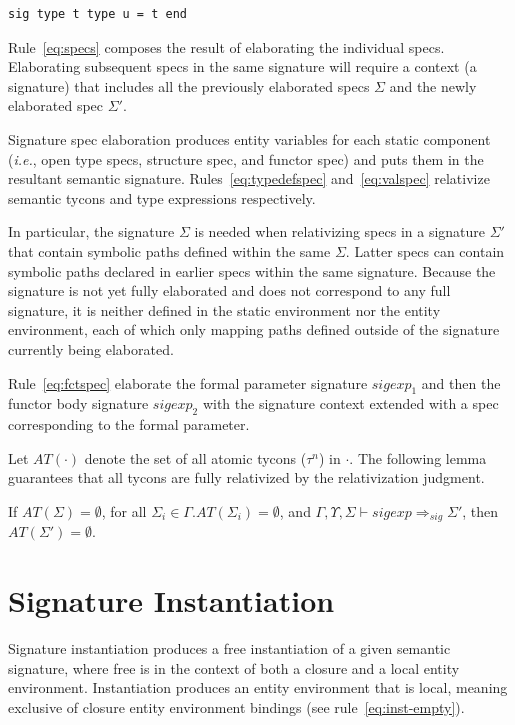 \documentclass[9pt,nocopyrightspace, fleqn]{sigplanconf}
\begin{document}
\begin{lstlisting}
sig type t type u = t end
\end{lstlisting}

Rule~\ref{eq:specs} composes the result of elaborating the individual specs. Elaborating subsequent specs in the same signature will require a context (a signature) that includes all the previously elaborated specs $\Sigma$ and the newly elaborated spec $\Sigma'$.  

Signature spec elaboration produces entity variables for each static
component (\emph{i.e.}, open type specs, structure spec, and functor
spec) and puts them in the resultant semantic
signature. Rules~\ref{eq:typedefspec} and~\ref{eq:valspec} relativize
semantic tycons and type expressions respectively. 

In particular, the signature $\Sigma$ is needed when relativizing specs in a signature $\Sigma'$ that contain symbolic paths defined within the same $\Sigma$. Latter specs can contain symbolic paths declared in earlier specs within the same signature. Because the signature is not yet fully elaborated and does not correspond to any full signature, it is neither defined in the static environment nor the entity environment, each of which only mapping paths defined outside of the signature currently being elaborated. 


Rule~\ref{eq:fctspec} elaborate the formal parameter signature $sigexp_1$ and then the functor body signature $sigexp_2$ with the signature context extended with a spec corresponding to the formal parameter. 

Let $AT(\cdot)$ denote the set of all atomic tycons ($\tau^n$) in $\cdot$. 
The following lemma guarantees that all tycons are fully relativized by the relativization judgment. 

\begin{lemma}
If $AT(\Sigma) = \emptyset$, for all $\Sigma_i\in\Gamma.AT(\Sigma_i)=\emptyset$, and $\Gamma,\Upsilon,\Sigma\vdash sigexp \Rightarrow_{sig} \Sigma'$, then $AT(\Sigma') = \emptyset$. 
\end{lemma}

\section{Signature Instantiation}\label{sec:siginst}

Signature instantiation produces a free instantiation of a given
semantic signature, where free is in the context of both a closure and
a local entity environment. Instantiation produces an entity
environment that is local, meaning exclusive of closure entity
environment bindings (see rule~\ref{eq:inst-empty}). 
\end{document}
